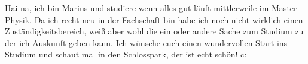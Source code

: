 \begin{multicols}{2}
{
Hai na, ich bin Marius und studiere wenn alles gut läuft mittlerweile im Master Physik. Da ich recht neu in der Fachschaft bin habe ich noch nicht wirklich einen Zuständigkeitsbereich, weiß aber wohl die ein oder andere Sache zum Studium zu der ich Auskunft geben kann. Ich wünsche euch einen wundervollen Start ins Studium und schaut mal in den Schlosspark, der ist echt schön! c:
}

\vspace{-0.18cm}


\end{multicols}
